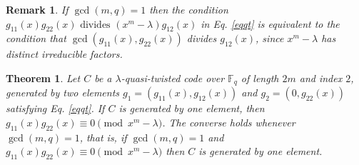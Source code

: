 \documentclass[10pt,a4paper]{amsart}
\newtheorem{remark}{Remark}
\newtheorem{theorem}{Theorem}
\begin{document}
\begin{remark}\label{remgcd1}
    If $\gcd(m,q)=1$ then the condition $g_{11}(x)g_{22}(x)\text{ divides } (x^m-\lambda)g_{12}(x)$ in Eq. \ref{eqqt} is equivalent to the condition that $\gcd (g_{11}(x),g_{22}(x))$ divides $g_{12}(x)$, since $x^m-\lambda$ has distinct irreducible factors. 
\end{remark}

 \begin{theorem}\label{2to1}
Let $C$ be a $\lambda$-quasi-twisted code over $\mathbb{F}_q$ of length $2m$ and index $2$, generated by two elements $g_1=(g_{11}(x),g_{12}(x))$ and $g_2=(0,g_{22}(x))$ satisfying Eq. \ref{eqqt}. If $C$ is generated by one element, then $g_{11}(x)g_{22}(x)\equiv 0\pmod{x^m-\lambda}$. The converse holds whenever $\gcd(m,q)=1$, that is, if $\gcd(m,q)=1$ and $g_{11}(x)g_{22}(x)\equiv 0\pmod{x^m-\lambda}$ then $C$ is generated by one element.     
 \end{theorem}
\end{document}
